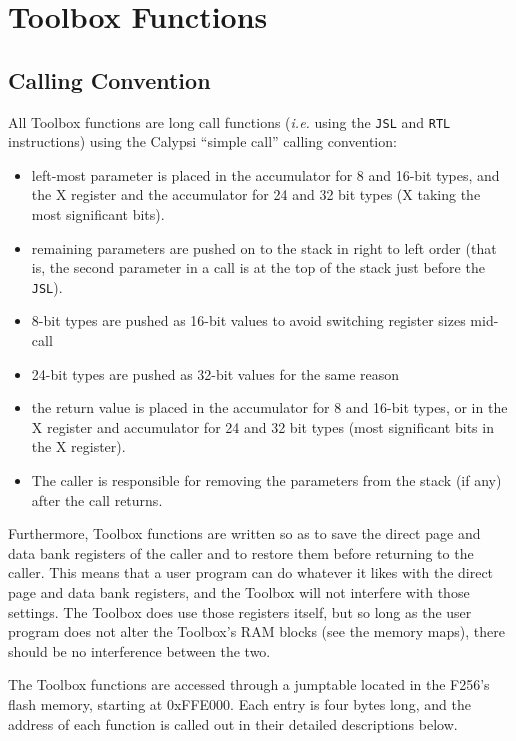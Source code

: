 \chapter{Toolbox Functions}

\section{Calling Convention}

All Toolbox functions are long call functions ({\it i.e.} using the \verb+JSL+ and \verb+RTL+ instructions) using the Calypsi ``simple call'' calling convention:
\begin{itemize}
	\item left-most parameter is placed in the accumulator for 8 and 16-bit types, and the X register and the accumulator for 24 and 32 bit types (X taking the most significant bits).
	\item remaining parameters are pushed on to the stack in right to left order (that is, the second parameter in a call is at the top of the stack just before the \verb+JSL+).
	\item 8-bit types are pushed as 16-bit values to avoid switching register sizes mid-call
	\item 24-bit types are pushed as 32-bit values for the same reason
	\item the return value is placed in the accumulator for 8 and 16-bit types, or in the X register and accumulator for 24 and 32 bit types (most significant bits in the X register).
	\item The caller is responsible for removing the parameters from the stack (if any) after the call returns.
\end{itemize}

Furthermore, Toolbox functions are written so as to save the direct page and data bank registers of the caller and to restore them before returning to the caller. This means that a user program can do whatever it likes with the direct page and data bank registers, and the Toolbox will not interfere with those settings. The Toolbox does use those registers itself, but so long as the user program does not alter the Toolbox's RAM blocks (see the memory maps), there should be no interference between the two.

The Toolbox functions are accessed through a jumptable located in the F256's flash memory, starting at 0xFFE000. Each entry is four bytes long, and the address of each function is called out in their detailed descriptions below.

